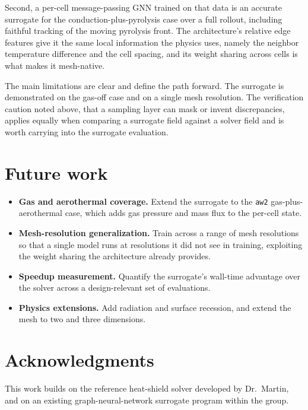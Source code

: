 \documentclass[11pt]{article}
\begin{document}
Second, a per-cell message-passing GNN trained on that data is an accurate
surrogate for the conduction-plus-pyrolysis case over a full rollout, including
faithful tracking of the moving pyrolysis front. The architecture's relative edge
features give it the same local information the physics uses, namely the neighbor
temperature difference and the cell spacing, and its weight sharing across cells is
what makes it mesh-native.

The main limitations are clear and define the path forward. The surrogate is
demonstrated on the gas-off case and on a single mesh resolution. The verification
caution noted above, that a sampling layer can mask or invent discrepancies,
applies equally when comparing a surrogate field against a solver field and is
worth carrying into the surrogate evaluation.

\section{Future work}

\begin{itemize}
  \item \textbf{Gas and aerothermal coverage.} Extend the surrogate to the
  \texttt{aw2} gas-plus-aerothermal case, which adds gas pressure and mass flux to
  the per-cell state.
  \item \textbf{Mesh-resolution generalization.} Train across a range of mesh
  resolutions so that a single model runs at resolutions it did not see in
  training, exploiting the weight sharing the architecture already provides.
  \item \textbf{Speedup measurement.} Quantify the surrogate's wall-time advantage
  over the solver across a design-relevant set of evaluations.
  \item \textbf{Physics extensions.} Add radiation and surface recession, and
  extend the mesh to two and three dimensions.
\end{itemize}

\section*{Acknowledgments}

This work builds on the reference heat-shield solver developed by Dr.\ Martin, and
on an existing graph-neural-network surrogate program within the group.
\end{document}
